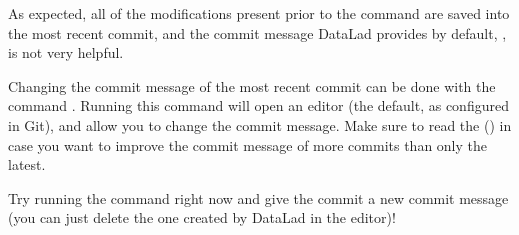 \sphinxAtStartPar
As expected, all of the modifications present prior to the
command are saved into the most recent commit, and the commit
message DataLad provides by default, ,
is not very helpful.

\sphinxAtStartPar
Changing the commit message of the most recent commit can be done with
the command . Running this command will open
an editor (the default, as configured in Git), and allow you
to change the commit message. Make sure to read the {\hyperref[\detokenize{basics/101-137-history:fom-rebase1}]{}} () in case you want to improve the commit message of more commits than only the latest.

\sphinxAtStartPar
Try running the  command right now and give
the commit a new commit message (you can just delete the one created by
DataLad in the editor)!

